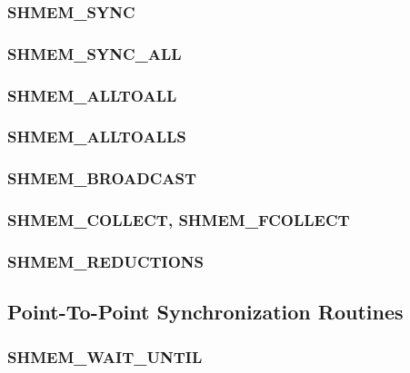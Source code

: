 \documentclass[10pt,oneside]{book}
\begin{document}
\subsubsection{\textbf{SHMEM\_SYNC}}\label{subsec:shmem_sync}


\subsubsection{\textbf{SHMEM\_SYNC\_ALL}}\label{subsec:shmem_sync_all}


\subsubsection{\textbf{SHMEM\_ALLTOALL}}\label{subsec:shmem_alltoall}


\subsubsection{\textbf{SHMEM\_ALLTOALLS}}\label{subsec:shmem_alltoalls}


\subsubsection{\textbf{SHMEM\_BROADCAST}}\label{subsec:shmem_broadcast}


\subsubsection{\textbf{SHMEM\_COLLECT, SHMEM\_FCOLLECT}}\label{subsec:shmem_collect}


\subsubsection{\textbf{SHMEM\_REDUCTIONS}}\label{subsec:shmem_reductions}





\subsection{Point-To-Point Synchronization Routines}\label{subsec:p2p_intro}


\subsubsection{\textbf{SHMEM\_WAIT\_UNTIL}}\label{subsec:shmem_wait_until}

\end{document}
